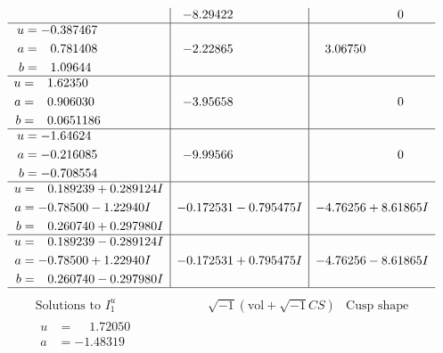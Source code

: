 \documentclass[1p]{elsarticle_modified}
\theoremstyle{definition}
\newcommand{\I}{\sqrt{-1}}
\begin{document}
$$\begin{array}{c|c|c}
 & -8.29422\phantom{ +0.000000I} & \phantom{-0.000000 } 0 \\ \hline\begin{aligned}
u &= -0.387467\phantom{ +0.000000I} \\
a &= \phantom{-}0.781408\phantom{ +0.000000I} \\
b &= \phantom{-}1.09644\phantom{ +0.000000I}\end{aligned}
 & -2.22865\phantom{ +0.000000I} & \phantom{-}3.06750\phantom{ +0.000000I} \\ \hline\begin{aligned}
u &= \phantom{-}1.62350\phantom{ +0.000000I} \\
a &= \phantom{-}0.906030\phantom{ +0.000000I} \\
b &= \phantom{-}0.0651186\phantom{ +0.000000I}\end{aligned}
 & -3.95658\phantom{ +0.000000I} & \phantom{-0.000000 } 0 \\ \hline\begin{aligned}
u &= -1.64624\phantom{ +0.000000I} \\
a &= -0.216085\phantom{ +0.000000I} \\
b &= -0.708554\phantom{ +0.000000I}\end{aligned}
 & -9.99566\phantom{ +0.000000I} & \phantom{-0.000000 } 0 \\ \hline\begin{aligned}
u &= \phantom{-}0.189239 + 0.289124 I \\
a &= -0.78500 - 1.22940 I \\
b &= \phantom{-}0.260740 + 0.297980 I\end{aligned}
 & -0.172531 - 0.795475 I & -4.76256 + 8.61865 I \\ \hline\begin{aligned}
u &= \phantom{-}0.189239 - 0.289124 I \\
a &= -0.78500 + 1.22940 I \\
b &= \phantom{-}0.260740 - 0.297980 I\end{aligned}
 & -0.172531 + 0.795475 I & -4.76256 - 8.61865 I\\
 \hline 
 \end{array}$$\newpage$$\begin{array}{c|c|c}  
\text{Solutions to }I^u_{1}& \I (\text{vol} + \sqrt{-1}CS) & \text{Cusp shape}\\
 \hline 
\begin{aligned}
u &= \phantom{-}1.72050\phantom{ +0.000000I} \\
a &= -1.48319\phantom{ +0.000000I} \\

\end{aligned}
\end{array}$$
\end{document}
